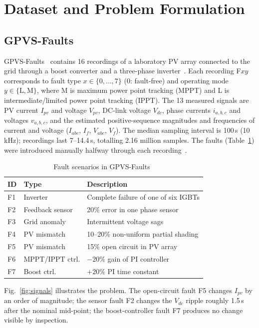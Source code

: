 \documentclass[conference]{IEEEtran}
\begin{document}
\section{Dataset and Problem Formulation}
\subsection{GPVS-Faults}
GPVS-Faults~\cite{bakdi2020gpvs} contains 16 recordings of a laboratory PV array connected to the grid through a boost converter and a three-phase inverter~\cite{guichi2018ippt}. Each recording F$xy$ corresponds to fault type $x\in\{0,\dots,7\}$ (0: fault-free) and operating mode $y\in\{\mathrm{L},\mathrm{M}\}$, where M is maximum power point tracking (MPPT) and L is intermediate/limited power point tracking (IPPT). The 13 measured signals are PV current $I_{pv}$ and voltage $V_{pv}$, DC-link voltage $V_{dc}$, phase currents $i_{a,b,c}$ and voltages $v_{a,b,c}$, and the estimated positive-sequence magnitudes and frequencies of current and voltage ($I_{abc}$, $I_f$, $V_{abc}$, $V_f$). The median sampling interval is 100\,\textmu s (10\,kHz); recordings last 7--14.4\,s, totalling 2.16 million samples. The faults (Table~\ref{tab:faults}) were introduced manually halfway through each recording~\cite{bakdi2020gpvs}.

\begin{table}[t]
\caption{Fault scenarios in GPVS-Faults~\cite{bakdi2021realtime}}
\label{tab:faults}
\centering
\footnotesize
\begin{tabular}{@{}lll@{}}
\toprule
ID & Type & Description \\
\midrule
F1 & Inverter & Complete failure of one of six IGBTs \\
F2 & Feedback sensor & 20\% error in one phase sensor \\
F3 & Grid anomaly & Intermittent voltage sags \\
F4 & PV mismatch & 10--20\% non-uniform partial shading \\
F5 & PV mismatch & 15\% open circuit in PV array \\
F6 & MPPT/IPPT ctrl. & $-20$\% gain of PI controller \\
F7 & Boost ctrl. & $+20$\% PI time constant \\
\bottomrule
\end{tabular}
\end{table}

Fig.~\ref{fig:signals} illustrates the problem. The open-circuit fault F5 changes $I_{pv}$ by an order of magnitude; the sensor fault F2 changes the $V_{dc}$ ripple roughly 1.5\,s after the nominal mid-point; the boost-controller fault F7 produces no change visible by inspection.
\end{document}

